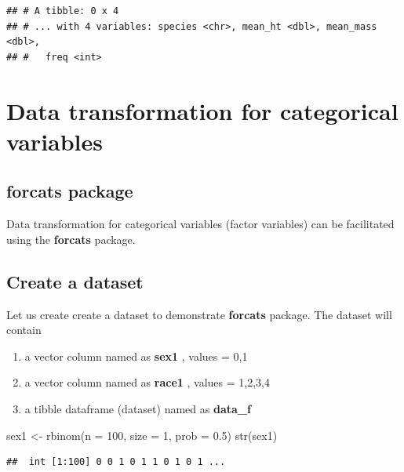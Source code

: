 \documentclass[
]{book}
\makeatletter
\newenvironment{Shaded}{\begin{snugshade}}{\end{snugshade}}
\newcommand{\AttributeTok}[1]{\textcolor[rgb]{0.61,0.61,0.61}{#1}}
\newcommand{\DecValTok}[1]{\textcolor[rgb]{0.06,0.06,0.06}{#1}}
\newcommand{\FloatTok}[1]{\textcolor[rgb]{0.06,0.06,0.06}{#1}}
\newcommand{\FunctionTok}[1]{\textcolor[rgb]{0,0,0}{#1}}
\newcommand{\NormalTok}[1]{#1}
\newcommand{\OtherTok}[1]{\textcolor[rgb]{0.37,0.37,0.37}{#1}}
\providecommand{\tightlist}{%
  \setlength{\itemsep}{0pt}\setlength{\parskip}{0pt}}
\newenvironment{kframe}{%
\medskip{}
\setlength{\fboxsep}{.8em}
 \def\at@end@of@kframe{}%
 \ifinner\ifhmode%
  \def\at@end@of@kframe{\end{minipage}}%
  \begin{minipage}{\columnwidth}%
 \fi\fi%
 \def\FrameCommand##1{\hskip\@totalleftmargin \hskip-\fboxsep
 \colorbox{shadecolor}{##1}\hskip-\fboxsep
     \hskip-\linewidth \hskip-\@totalleftmargin \hskip\columnwidth}%
 \MakeFramed {\advance\hsize-\width
   \@totalleftmargin\z@ \linewidth\hsize
   \@setminipage}}%
 {\par\unskip\endMakeFramed%
 \at@end@of@kframe}
\renewenvironment{Shaded}{\begin{kframe}}{\end{kframe}}
\makeatother
\begin{document}
\begin{verbatim}
## # A tibble: 0 x 4
## # ... with 4 variables: species <chr>, mean_ht <dbl>, mean_mass <dbl>,
## #   freq <int>
\end{verbatim}

\hypertarget{data-transformation-for-categorical-variables}{%
\section{Data transformation for categorical variables}\label{data-transformation-for-categorical-variables}}

\hypertarget{forcats-package}{%
\subsection{\texorpdfstring{\textbf{forcats} package}{forcats package}}\label{forcats-package}}

Data transformation for categorical variables (factor variables) can be facilitated using the \textbf{forcats} package.

\hypertarget{create-a-dataset}{%
\subsection{Create a dataset}\label{create-a-dataset}}

Let us create create a dataset to demonstrate \textbf{forcats} package. The dataset will contain

\begin{enumerate}
\def\labelenumi{\arabic{enumi}.}
\tightlist
\item
  a vector column named as \textbf{sex1} , values = 0,1
\item
  a vector column named as \textbf{race1} , values = 1,2,3,4
\item
  a tibble dataframe (dataset) named as \textbf{data\_f}
\end{enumerate}

\begin{Shaded}
\begin{Highlighting}[]
\NormalTok{sex1 }\OtherTok{\textless{}{-}} \FunctionTok{rbinom}\NormalTok{(}\AttributeTok{n =} \DecValTok{100}\NormalTok{, }\AttributeTok{size =} \DecValTok{1}\NormalTok{, }\AttributeTok{prob =} \FloatTok{0.5}\NormalTok{) }
\FunctionTok{str}\NormalTok{(sex1)}
\end{Highlighting}
\end{Shaded}

\begin{verbatim}
##  int [1:100] 0 0 1 0 1 1 0 1 0 1 ...
\end{verbatim}
\end{document}
